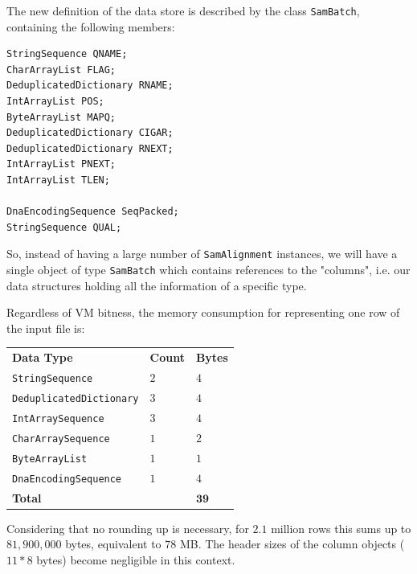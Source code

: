 \documentclass[a4paper,twoside]{article}
\begin{document}
The new definition of the data store is described by the class {\texttt{SamBatch}}, containing the following members:
\begin{small}
\begin{verbatim}
StringSequence QNAME;
CharArrayList FLAG;
DeduplicatedDictionary RNAME;
IntArrayList POS;
ByteArrayList MAPQ;
DeduplicatedDictionary CIGAR;
DeduplicatedDictionary RNEXT;
IntArrayList PNEXT;
IntArrayList TLEN;

DnaEncodingSequence SeqPacked;
StringSequence QUAL;
\end{verbatim}
\end{small}

So, instead of having a large number of {\texttt{SamAlignment}} instances, we will have a single object of type {\texttt{SamBatch}} which contains references to the "columns", i.e. our data structures holding all the information of a specific type.


Regardless of VM bitness, the memory consumption for representing one row of the input file is: 
\begin{center}
\begin{tabular}{ l l l }
 {\textbf{Data Type}} 				& {\textbf{Count}} 		& {\textbf{Bytes}} \\
 {\texttt{StringSequence}} 		    & $2$ 				& $4$ \\
 {\texttt{DeduplicatedDictionary}}	& $3$ 				& $4$ \\
 {\texttt{IntArraySequence}}		& $3$		 		& $4$ \\
 {\texttt{CharArraySequence}}		& $1$				& $2$ \\
 {\texttt{ByteArrayList}}			& $1$				& $1$ \\
 {\texttt{DnaEncodingSequence}}	    & $1$ 				& $4$ \\
 {\textbf{Total}}					& 					& $\mathbf{39}$
\end{tabular}
\end{center}

Considering that no rounding up is necessary, for $2.1$ million rows this sums up to $81,900,000$ bytes,
equivalent to $78$ MB. The header sizes of the column objects ($11*8$ bytes) become negligible in this context.
\end{document}
